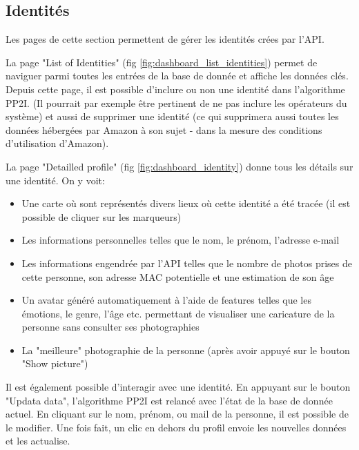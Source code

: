 \subsection{Identités}
Les pages de cette section permettent de gérer les identités crées par l'API.

La page "List of Identities" (fig \ref{fig:dashboard_list_identities}) permet de naviguer parmi toutes les entrées de la base de donnée et affiche les données clés.
Depuis cette page, il est possible d'inclure ou non une identité dans l'algorithme PP2I. (Il pourrait par exemple être pertinent de ne pas inclure les opérateurs du système)
et aussi de supprimer une identité (ce qui supprimera aussi toutes les données hébergées par Amazon à son sujet - dans la mesure des conditions d'utilisation d'Amazon).

La page "Detailled profile" (fig \ref{fig:dashboard_identity}) donne tous les détails sur une identité. On y voit:
\begin{itemize}
    \item Une carte où sont représentés divers lieux où cette identité a été tracée (il est possible de cliquer sur les marqueurs)
    \item Les informations personnelles telles que le nom, le prénom, l'adresse e-mail
    \item Les informations engendrée par l'API telles que le nombre de photos prises de cette personne, son adresse MAC potentielle et une estimation de son âge
    \item Un avatar généré automatiquement à l'aide de features telles que les émotions, le genre, l'âge etc. permettant de visualiser une caricature de la personne sans consulter ses photographies
    \item La "meilleure" photographie de la personne (après avoir appuyé sur le bouton "Show picture")
\end{itemize}

Il est également possible d'interagir avec une identité. En appuyant sur le bouton "Updata data", l'algorithme PP2I est relancé avec l'état de la base de donnée actuel.
En cliquant sur le nom, prénom, ou mail de la personne, il est possible de le modifier. Une fois fait, un clic en dehors du profil envoie les nouvelles données et les actualise.

